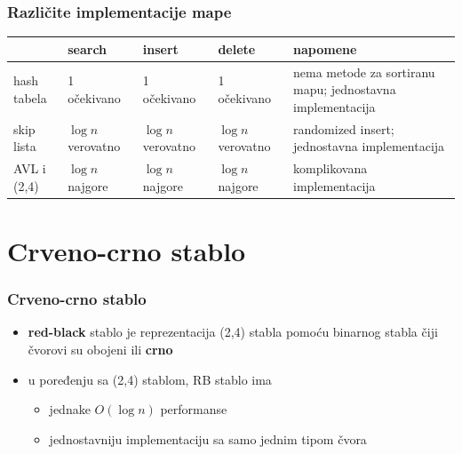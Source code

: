 \documentclass[compress]{beamer}
\begin{document}
\begin{frame}[fragile]
  \frametitle{Različite implementacije mape}
  \begin{tabular}{p{2cm}|p{1cm}|p{1cm}|p{1cm}|p{4cm}}
  & \textbf{search} & \textbf{insert} & \textbf{delete} & \textbf{napomene} \\ \hline\hline
  hash tabela & 1 \mbox{\tiny očekivano} & 1 \mbox{\tiny očekivano} & 1 \mbox{\tiny očekivano} & {\scriptsize nema metode za sortiranu mapu; jednostavna implementacija} \\ \hline
  skip lista & $\log n$ \mbox{\tiny verovatno} & $\log n$ \mbox{\tiny verovatno} & $\log n$ \mbox{\tiny verovatno} & {\scriptsize randomized insert; jednostavna implementacija} \\ \hline
  AVL i (2,4) & $\log n$ \mbox{\tiny najgore} & $\log n$ \mbox{\tiny najgore} & $\log n$ \mbox{\tiny najgore} & {\scriptsize komplikovana implementacija} \\ \hline
  \end{tabular}
\end{frame}

\section[RB stablo]{Crveno-crno stablo}

\begin{frame}[fragile]
  \frametitle{Crveno-crno stablo}
  \begin{itemize}
    \item \textbf{red-black} stablo je reprezentacija (2,4) stabla pomoću binarnog stabla čiji čvorovi su obojeni  ili \textbf{crno}
    \item u poređenju sa (2,4) stablom, RB stablo ima
    \begin{itemize}
      \item jednake $O(\log n)$ performanse
      \item jednostavniju implementaciju sa samo jednim tipom čvora
    \end{itemize}
  \end{itemize}
\end{frame}
\end{document}
